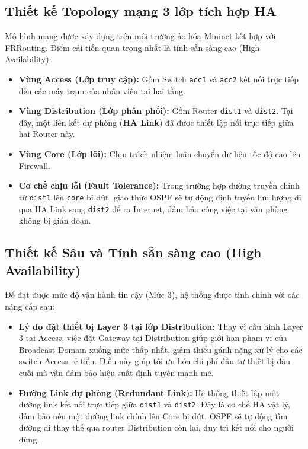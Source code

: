 \subsection{Thiết kế Topology mạng 3 lớp tích hợp HA}
Mô hình mạng được xây dựng trên môi trường ảo hóa Mininet kết hợp với FRRouting. Điểm cải tiến quan trọng nhất là tính sẵn sàng cao (High Availability):
\begin{itemize}
    \item \textbf{Vùng Access (Lớp truy cập):} Gồm Switch \texttt{acc1} và \texttt{acc2} kết nối trực tiếp đến các máy trạm của nhân viên tại hai tầng.
    \item \textbf{Vùng Distribution (Lớp phân phối):} Gồm Router \texttt{dist1} và \texttt{dist2}. Tại đây, một liên kết dự phòng (\textbf{HA Link}) đã được thiết lập nối trực tiếp giữa hai Router này.
    \item \textbf{Vùng Core (Lớp lõi):} Chịu trách nhiệm luân chuyển dữ liệu tốc độ cao lên Firewall.
    \item \textbf{Cơ chế chịu lỗi (Fault Tolerance):} Trong trường hợp đường truyền chính từ \texttt{dist1} lên \texttt{core} bị đứt, giao thức OSPF sẽ tự động định tuyến lưu lượng đi qua HA Link sang \texttt{dist2} để ra Internet, đảm bảo công việc tại văn phòng không bị gián đoạn.
\end{itemize}


\subsection{Thiết kế Sâu và Tính sẵn sàng cao (High Availability)}
Để đạt được mức độ vận hành tin cậy (Mức 3), hệ thống được tinh chỉnh với các nâng cấp sau:
\begin{itemize}
    \item \textbf{Lý do đặt thiết bị Layer 3 tại lớp Distribution:} Thay vì cấu hình Layer 3 tại Access, việc đặt Gateway tại Distribution giúp giới hạn phạm vi của Broadcast Domain xuống mức thấp nhất, giảm thiểu gánh nặng xử lý cho các switch Access rẻ tiền. Điều này giúp tối ưu hóa chi phí đầu tư thiết bị đầu cuối mà vẫn đảm bảo hiệu suất định tuyến mạnh mẽ.
    \item \textbf{Đường Link dự phòng (Redundant Link):} Hệ thống thiết lập một đường link kết nối trực tiếp giữa \texttt{dist1} và \texttt{dist2}. Đây là cơ chế HA vật lý, đảm bảo nếu một đường link chính lên Core bị đứt, OSPF sẽ tự động tìm đường đi thay thế qua router Distribution còn lại, duy trì kết nối cho người dùng.
\end{itemize}

